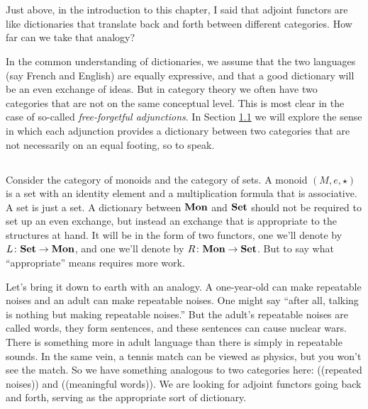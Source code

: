 \documentclass[CT4S-EN-RU]{subfiles}
\begin{document}
\section{}

Just above, in the introduction to this chapter, I said that adjoint functors are like dictionaries that translate back and forth between different categories. How far can we take that analogy?

In the common understanding of dictionaries, we assume that the two languages (say French and English) are equally expressive, and that a good dictionary will be an even exchange of ideas. But in category theory we often have two categories that are not on the same conceptual level. This is most clear in the case of so-called {\em free-forgetful adjunctions}. In Section \ref{sec:adjoints discuss and define} we will explore the sense in which each adjunction provides a dictionary between two categories that are not necessarily on an equal footing, so to speak.


\subsection{}\label{sec:adjoints discuss and define}

Consider the category of monoids and the category of sets. A monoid $(M,e,\star)$ is a set with an identity element and a multiplication formula that is associative. A set is just a set. A dictionary between ${\bf Mon}$ and ${\bf Set}$ should not be required to set up an even exchange, but instead an exchange that is appropriate to the structures at hand. It will be in the form of two functors, one we'll denote by $L\colon{\bf Set}\rightarrow{\bf Mon}$, and one we'll denote by $R\colon{\bf Mon}\rightarrow{\bf Set}$. But to say what “appropriate” means requires more work.

Let's bring it down to earth with an analogy. A one-year-old can make repeatable noises and an adult can make repeatable noises. One might say “after all, talking is nothing but making repeatable noises.” But the adult's repeatable noises are called words, they form sentences, and these sentences can cause nuclear wars. There is something more in adult language than there is simply in repeatable sounds. In the same vein, a tennis match can be viewed as physics, but you won't see the match. So we have something analogous to two categories here: ((repeated noises)) and ((meaningful words)). We are looking for adjoint functors going back and forth, serving as the appropriate sort of dictionary.
\end{document}

